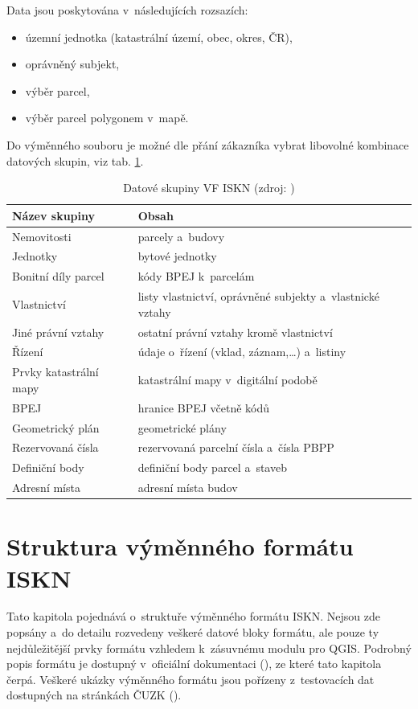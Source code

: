 \documentclass[a4paper,12pt,oneside]{book}
\begin{document}
Data jsou poskytována v~následujících rozsazích:

\begin{itemize}
 \item územní jednotka (katastrální území, obec, okres, ČR),
 \item oprávněný subjekt,
 \item výběr parcel,
 \item výběr parcel polygonem v~mapě.
\end{itemize}

Do výměnného souboru je možné dle přání zákazníka vybrat libovolné kombinace datových skupin, viz tab. \ref{t_datove_skupiny}. \cite{dp_landa}

\begin{table}[htbp]
\centering
\caption[Datové skupiny VF ISKN]{Datové skupiny VF ISKN (zdroj: \cite{nvf_cuzk})}
\begin{tabular}{ll}
\toprule
\textbf{Název skupiny} & \textbf{Obsah} \\ 
\midrule
Nemovitosti & parcely a~budovy \\ 
Jednotky & bytové jednotky \\ 
Bonitní díly parcel & kódy BPEJ k~parcelám \\ 
Vlastnictví & \parbox{220pt}{listy vlastnictví, oprávněné subjekty a~vlastnické vztahy} \\ 
Jiné právní vztahy & ostatní právní vztahy kromě vlastnictví \\ 
Řízení & údaje o~řízení (vklad, záznam,…) a~listiny \\ 
Prvky katastrální mapy & katastrální mapy v~digitální podobě \\ 
BPEJ & hranice BPEJ včetně kódů \\ 
Geometrický plán & geometrické plány \\ 
Rezervovaná čísla & rezervovaná parcelní čísla a~čísla PBPP \\ 
Definiční body & definiční body parcel a~staveb \\ 
Adresní místa & adresní místa budov \\
\bottomrule
\end{tabular}
\label{t_datove_skupiny}
\end{table}

\newpage
\section{Struktura výměnného formátu ISKN}

Tato kapitola pojednává o~struktuře výměnného formátu ISKN. Nejsou zde popsány a~do detailu rozvedeny veškeré datové bloky formátu, ale pouze ty nejdůležitější prvky formátu vzhledem k~zásuvnému modulu pro QGIS. Podrobný popis formátu je dostupný v~oficiální dokumentaci (\cite{vfk_struktura}), ze které tato kapitola čerpá. Veškeré ukázky výměnného formátu jsou pořízeny z~testovacích dat dostupných na stránkách ČUZK (\cite{nvf_cuzk}).
\end{document}
